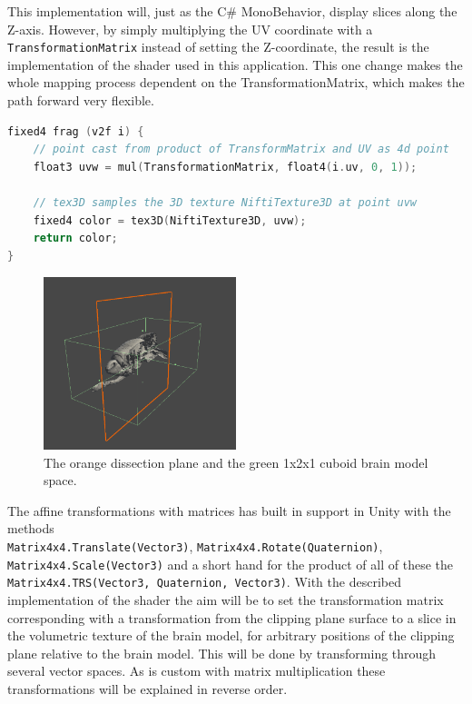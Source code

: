 This implementation will, just as the C\# MonoBehavior, display slices along the Z-axis. However, by simply multiplying the UV coordinate with a \texttt{TransformationMatrix} instead of setting the Z-coordinate, the result is the implementation of the shader used in this application. This one change makes the whole mapping process dependent on the TransformationMatrix, which makes the path forward very flexible.

\begin{lstlisting}[language=c]
fixed4 frag (v2f i) {
    // point cast from product of TransformMatrix and UV as 4d point
    float3 uvw = mul(TransformationMatrix, float4(i.uv, 0, 1));

    // tex3D samples the 3D texture NiftiTexture3D at point uvw
    fixed4 color = tex3D(NiftiTexture3D, uvw);
    return color;
}
\end{lstlisting}
\begin{figure}[ht]
    \centering
    \includegraphics[width=0.5\textwidth]{fig/dissection_boxplaneview.png}
    \caption{The orange dissection plane and the green 1x2x1 cuboid brain model space.}
    \label{fig:boxandplanedissect}
\end{figure}

The affine transformations with matrices has built in support in Unity with the methods\\ \texttt{Matrix4x4.Translate(Vector3)}, \texttt{Matrix4x4.Rotate(Quaternion)}, \texttt{Matrix4x4.Scale(Vector3)} and a short hand for the product of all of these the \texttt{Matrix4x4.TRS(Vector3, Quaternion, Vector3)}. 
With the described implementation of the shader the aim will be to set the transformation matrix corresponding with a transformation from the clipping plane surface to a slice in the volumetric texture of the brain model, for arbitrary positions of the clipping plane relative to the brain model. This will be done by transforming through several vector spaces. As is custom with matrix multiplication these transformations will be explained in reverse order. 

